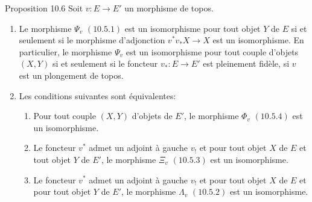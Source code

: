 \documentclass[10pt]{../fichiers-configuration-latex/smfart}
\begin{document}
\begin{enonce*}{Proposition 10.6}
Soit $v:E\rightarrow E'$ un morphisme de topos.
\begin{enumerate}
\renewcommand{\labelenumi}{\theenumi)}
\item Le morphisme $\Psi_v$ $(\hyperref[IV.subsubsec10.5.1]{10.5.1})$ est un
  isomorphisme pour tout
objet $Y$ de $E$ si et seulement si le morphisme d'adjonction
$v^{\ast}v_{\ast}X\rightarrow X$ est un isomorphisme. En
particulier, le morphisme $\Psi_v$ est un isomorphisme pour tout
couple d'objets $(X,Y)$ si et seulement si le foncteur
$v_{\ast}:E\rightarrow E'$ est pleinement fidèle, \ie si $v$ est un
plongement de topos.

\item Les conditions suivantes sont équivalentes:
\begin{enumerate}
\renewcommand{\theenumii}{\roman{enumii}}
\renewcommand{\labelenumii}{(\theenumii)}
\item Pour tout couple $(X,Y)$ d'objets de $E'$, le morphisme $\Phi_v$
$(\hyperref[IV.subsubsec10.5.4]{10.5.4})$ est un isomorphisme.

\item Le foncteur $v^{\ast}$ admet un adjoint à gauche $v_{!}$ et pour
tout objet $X$ de $E$ et tout objet $Y$ de $E'$, le morphisme
$\Xi_v$ $(\hyperref[IV.subsubsec10.5.3]{10.5.3})$ est un isomorphisme.

\item Le foncteur $v^{\ast}$ admet un adjoint à gauche $v_{!}$ et pour
tout objet $X$ de $E$ et pour tout objet $Y$ de $E'$, le morphisme
$\Lambda_v$ $(\hyperref[IV.subsubsec10.5.2]{10.5.2})$ est un isomorphisme.
\end{enumerate}
\end{enumerate}
\end{enonce*}

\setcounter{subsection}{6} \setcounter{subsubsection}{0}
\end{document}
